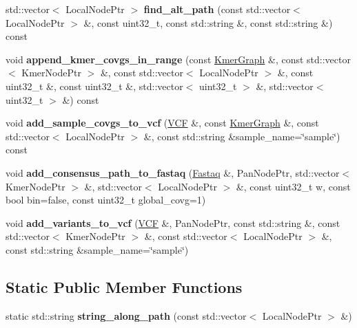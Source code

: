 \begin{DoxyCompactItemize}
\item 
\mbox{\label{classLocalPRG_a5f3dbbd8e8c5d7571847957ff401e83b}} 
std\+::vector$<$ Local\+Node\+Ptr $>$ {\bfseries find\+\_\+alt\+\_\+path} (const std\+::vector$<$ Local\+Node\+Ptr $>$ \&, const uint32\+\_\+t, const std\+::string \&, const std\+::string \&) const
\item 
\mbox{\label{classLocalPRG_ad9f3b252cdbb7d23fb36543917c0bc0a}} 
void {\bfseries append\+\_\+kmer\+\_\+covgs\+\_\+in\+\_\+range} (const \hyperlink{classKmerGraph}{Kmer\+Graph} \&, const std\+::vector$<$ Kmer\+Node\+Ptr $>$ \&, const std\+::vector$<$ Local\+Node\+Ptr $>$ \&, const uint32\+\_\+t \&, const uint32\+\_\+t \&, std\+::vector$<$ uint32\+\_\+t $>$ \&, std\+::vector$<$ uint32\+\_\+t $>$ \&) const
\item 
\mbox{\label{classLocalPRG_ab38532465665803109701ca3166b67c8}} 
void {\bfseries add\+\_\+sample\+\_\+covgs\+\_\+to\+\_\+vcf} (\hyperlink{classVCF}{V\+CF} \&, const \hyperlink{classKmerGraph}{Kmer\+Graph} \&, const std\+::vector$<$ Local\+Node\+Ptr $>$ \&, const std\+::string \&sample\+\_\+name=\char`\"{}sample\char`\"{}) const
\item 
\mbox{\label{classLocalPRG_a6cf906c1307763026cf185f07d8eace7}} 
void {\bfseries add\+\_\+consensus\+\_\+path\+\_\+to\+\_\+fastaq} (\hyperlink{structFastaq}{Fastaq} \&, Pan\+Node\+Ptr, std\+::vector$<$ Kmer\+Node\+Ptr $>$ \&, std\+::vector$<$ Local\+Node\+Ptr $>$ \&, const uint32\+\_\+t w, const bool bin=false, const uint32\+\_\+t global\+\_\+covg=1)
\item 
\mbox{\label{classLocalPRG_a0f1b2f176fc2c36bd05f7caca3c8127e}} 
void {\bfseries add\+\_\+variants\+\_\+to\+\_\+vcf} (\hyperlink{classVCF}{V\+CF} \&, Pan\+Node\+Ptr, const std\+::string \&, const std\+::vector$<$ Kmer\+Node\+Ptr $>$ \&, const std\+::vector$<$ Local\+Node\+Ptr $>$ \&, const std\+::string \&sample\+\_\+name=\char`\"{}sample\char`\"{})
\end{DoxyCompactItemize}
\subsection*{Static Public Member Functions}
\begin{DoxyCompactItemize}
\item 
\mbox{\label{classLocalPRG_a44590a1c176f93c150cc8137a98f52c7}} 
static std\+::string {\bfseries string\+\_\+along\+\_\+path} (const std\+::vector$<$ Local\+Node\+Ptr $>$ \&)
\end{DoxyCompactItemize}
